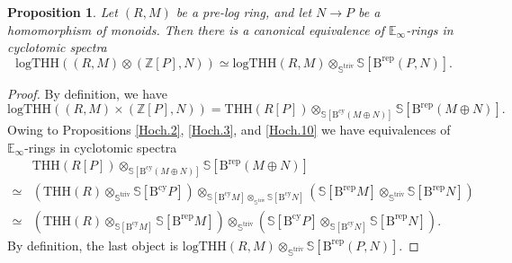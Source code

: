 \documentclass[11pt, a4paper]{amsart}
\newtheorem{prop}[thm]{Proposition}
\theoremstyle{definition}
\numberwithin{equation}{subsection}
\newcommand{\Z}{\mathbb{Z}}
\newcommand{\E}{\mathbb{E}}
\newcommand{\THH}{\mathrm{THH}}
\newcommand{\Brep}{\operatorname{B^{rep}}}
\newcommand{\Bcy}{\operatorname{B^{cy}}}
\newcommand{\Sphere}{\mathbb{S}}
\newcommand{\logTHH}{\mathrm{logTHH}}
\newcommand{\Striv}{\mathbb{S}^{\mathrm{triv}}}
\begin{document}
\begin{prop}
\label{Hoch.11}
Let $(R,M)$ be a pre-log ring, and let $N\to P$ be a homomorphism of monoids.
Then there is a canonical equivalence of $\E_\infty$-rings in cyclotomic spectra
\begin{equation}
\label{Hoch.11.1}
\logTHH((R,M)\otimes (\Z[P],N))
\simeq
\logTHH(R,M)
\otimes_{\Striv}
\Sphere[\Brep(P,N)].
\end{equation}
\end{prop}
\begin{proof}
By definition, 
we have
\[
\logTHH((R,M)\times (\Z[P],N))
=
\THH(R[P])\otimes_{\Sphere[\Bcy(M\oplus N)]}\Sphere[\Brep(M\oplus N)].
\]
Owing to Propositions \ref{Hoch.2}, \ref{Hoch.3}, and \ref{Hoch.10} 
we have equivalences of $\E_\infty$-rings in cyclotomic spectra
\begin{align*}
& \THH(R[P])\otimes_{\Sphere[\Bcy(M\oplus N)]}\Sphere[\Brep(M\oplus N)]
\\
\simeq &
(\THH(R)\otimes_{\Striv} \Sphere[\Bcy P])
\otimes_{\Sphere[\Bcy M]\otimes_{\Striv} \Sphere[\Bcy N]}
(\Sphere[\Brep M]\otimes_{\Striv} \Sphere[\Brep N])
\\
\simeq &
(\THH(R)\otimes_{\Sphere[\Bcy M]}\Sphere[\Brep M])
\otimes_{\Striv}
(\Sphere[\Bcy P]\otimes_{\Sphere[\Bcy N]}\Sphere[\Brep N]).
\end{align*}
By definition, 
the last object is $\logTHH(R,M)\otimes_{\Striv} \Sphere[\Brep(P,N)]$.
\end{proof}
\end{document}
